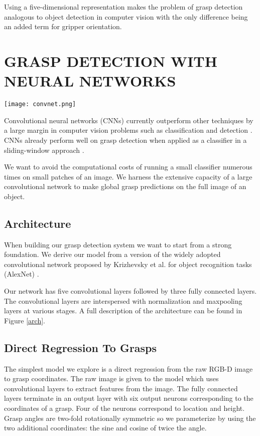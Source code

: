 \documentclass[letterpaper, 10 pt, conference]{ieeeconf}
\begin{document}
Using a five-dimensional representation makes the problem of grasp detection analogous to object detection in computer vision with the only difference being an added term for gripper orientation.


\section{GRASP DETECTION WITH NEURAL NETWORKS}

   \begin{figure*}[thpb]
      \centering
        \texttt{[image: convnet.png]}
      \caption{The full architecture of our direct regression grasp model.}
      \label{arch}
   \end{figure*}


Convolutional neural networks (CNNs) currently outperform other techniques by a large margin in computer vision problems such as classification \cite{krizhevsky2012imagenet} and detection \cite{girshick14CVPR}. CNNs already perform well on grasp detection when applied as a classifier in a sliding-window approach \cite{lenz2013deep}.

We want to avoid the computational costs of running a small classifier numerous times on small patches of an image. We harness the extensive capacity of a large convolutional network to make global grasp predictions on the full image of an object.

\subsection{Architecture}

When building our grasp detection system we want to start from a strong foundation. We derive our model from a version of the widely adopted convolutional network proposed by Krizhevsky et al. for object recognition tasks (AlexNet) \cite{krizhevsky2012imagenet}.

Our network has five convolutional layers followed by three fully connected layers. The convolutional layers are interspersed with normalization and maxpooling layers at various stages. A full description of the architecture can be found in Figure \ref{arch}.


\subsection{Direct Regression To Grasps}

The simplest model we explore is a direct regression from the raw RGB-D image to grasp coordinates. The raw image is given to the model which uses convolutional layers to extract features from the image. The fully connected layers terminate in an output layer with six output neurons corresponding to the coordinates of a grasp. Four of the neurons correspond to location and height. Grasp angles are two-fold rotationally symmetric so we parameterize by using the two additional coordinates: the sine and cosine of twice the angle.
\end{document}
